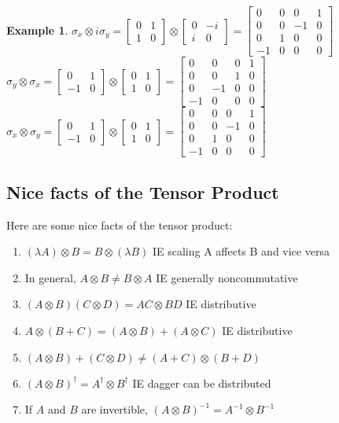 \documentclass[12pt]{article}
\theoremstyle{plain}
\theoremstyle{nonumberplain}
\theoremstyle{plain}
\newtheorem{example}[lemma]{Example}
\theoremstyle{nonumberplain}
\newcommand\1{{\bf 1}}
\newcommand{\bmat}[1]{\begin{bmatrix*} #1 \end{bmatrix*}} %
\newcommand{\<}{\left\langle}
\renewcommand{\>}{\right\rangle}
\begin{document}
\begin{example}
$\sigma_x\otimes i\sigma_y=\bmat{0 & 1 \\ 1 & 0}\otimes\bmat{0 & -i \\ i & 0}=
\bmat{
0 & 0 & 0 & 1 \\
0 & 0 & -1 & 0 \\
0 & 1 & 0 & 0 \\
-1 & 0 & 0 & 0
}$ \\
$\sigma_y\otimes \sigma_x=\bmat{0 & 1 \\ -1 & 0}\otimes\bmat{0 & 1 \\ 1 & 0}=
\bmat{
0 & 0 & 0 & 1 \\
0 & 0 & 1 & 0 \\
0 & -1 & 0 & 0 \\
-1 & 0 & 0 & 0
}$ \\
$\sigma_x\otimes \sigma_y=\bmat{0 & 1 \\ -1 & 0}\otimes\bmat{0 & 1 \\ 1 & 0}=
\bmat{
0 & 0 & 0 & 1 \\
0 & 0 & -1 & 0 \\
0 & 1 & 0 & 0 \\
-1 & 0 & 0 & 0
}$
\end{example}


\subsection{Nice facts of the Tensor Product}
Here are some nice facts of the tensor product:
\begin{enumerate}
\item $(\lambda A)\otimes B=B \otimes (\lambda B)$ IE scaling A affects B and vice versa
\item In general, $A\otimes B\neq B\otimes A$ IE generally noncommutative
\item $(A\otimes B)(C \otimes D)=AC\otimes BD$ IE distributive
\item $A\otimes (B+C)=(A\otimes B)+(A\otimes C)$ IE distributive
\item $(A\otimes B)+(C\otimes D)\neq (A + C)\otimes (B + D)$
\item $(A\otimes B)^\dagger=A^\dagger \otimes B^\dagger$ IE dagger can be distributed
\item If $A$ and $B$ are invertible, $(A\otimes B)^{-1}=A^{-1} \otimes B^{-1}$
\end{enumerate}
\end{document}
